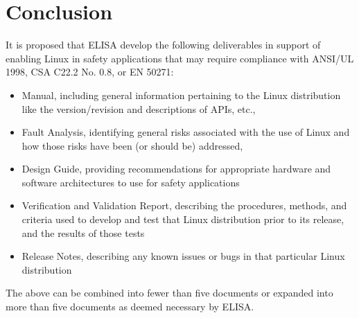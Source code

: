 \documentclass[12pt]{../Common_files/ElisaPaper}
\begin{document}
\section{Conclusion}
It is proposed that ELISA develop the following deliverables in support of enabling Linux in safety applications that may require compliance with ANSI/UL 1998, CSA C22.2 No. 0.8, or EN 50271:

\begin{itemize}

\item Manual, including general information pertaining to the Linux distribution like the version/revision and descriptions of APIs, etc.,

\item Fault Analysis, identifying general risks associated with the use of Linux and how those risks have been (or should be) addressed,

\item Design Guide, providing recommendations for appropriate hardware and software architectures to use for safety applications


\item Verification and Validation Report, describing the procedures, methods, and criteria used to develop and test that Linux distribution prior to its release, and the results of those tests

\item Release Notes, describing any known issues or bugs in that particular Linux distribution

\end{itemize}

The above can be combined into fewer than five documents or expanded into more than five documents as deemed necessary by ELISA.
	
\end{document}
